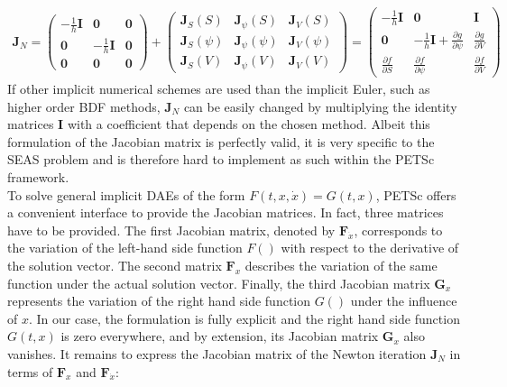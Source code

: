 \begin{align}
	\label{eq:Jacobian_Newton_Iteration_extended_DAE}
	\mathbf{J}_N = 
		\begin{pmatrix} 
		 	-\frac{1}{h}\mathbf{I} & \mathbf{0}            & \mathbf{0} \\ 
		   	\mathbf{0}             &-\frac{1}{h}\mathbf{I} & \mathbf{0} \\ 
		    \mathbf{0}             & \mathbf{0}            & \mathbf{0} 
	 	\end{pmatrix} + 
       	\begin{pmatrix}  
       		\mathbf{J}_S(S)    &  \mathbf{J}_\psi(S)    &  \mathbf{J}_V(S)    \\ 
			\mathbf{J}_S(\psi) &  \mathbf{J}_\psi(\psi) &  \mathbf{J}_V(\psi) \\ 
			\mathbf{J}_S(V)    &  \mathbf{J}_\psi(V)    &  \mathbf{J}_V(V)
		\end{pmatrix} =
		\begin{pmatrix} 
			-\frac{1}{h}\mathbf{I}         &  \mathbf{0} 			            &
			\mathbf{I}                     \\ 
			\mathbf{0}                    & 
			-\frac{1}{h}\mathbf{I} +  \frac{\partial g}{\partial \psi}       &  \frac{\partial g}{\partial V} \\ 
			\frac{\partial f}{\partial S} & \frac{\partial f}{\partial \psi} &  \frac{\partial f}{\partial V} 
		 \end{pmatrix}
\end{align}
If other implicit numerical schemes are used than the implicit Euler, such as higher order BDF methods, $\mathbf{J}_N$ can be easily changed by multiplying the identity matrices $\mathbf{I}$ with a coefficient that depends on the chosen method. Albeit this formulation of the Jacobian matrix is perfectly valid, it is very specific to the SEAS problem and is therefore hard to implement as such within the PETSc framework. \\
To solve general implicit DAEs of the form $F(t,x,\dot{x}) = G(t,x)$, PETSc offers a convenient interface to provide the Jacobian matrices. In fact, three matrices have to be provided. The first Jacobian matrix, denoted by $\mathbf{F}_{\dot{x}}$, corresponds to the variation of the left-hand side function $F()$ with respect to the derivative of the solution vector. The second matrix $\mathbf{F}_x$ describes the variation of the same function under the actual solution vector. Finally, the third Jacobian matrix $\mathbf{G}_x$ represents the variation of the right hand side function $G()$ under the influence of $x$. In our case, the formulation is fully explicit and the right hand side function $G(t,x)$ is zero everywhere, and by extension, its Jacobian matrix $\mathbf{G}_x$ also vanishes. It remains to express the Jacobian matrix of the Newton iteration $\mathbf{J}_N$ in terms of $\mathbf{F}_x$ and $\mathbf{F}_{\dot{x}}$:

